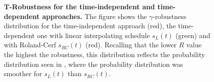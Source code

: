 \begin{figure}[ht]
  \centering
  \caption[Robustness for the time-independent hamiltonian]{\textbf{$\bm{T}$-Robustness for the time-independent and time-dependent approaches.} The figure shows the $\gamma$-robustness distribution for the time-independent approach (red), the time-dependent one with linear interpolating schedule $s_L(t)$ (green) and with Roland-Cerf $s_{RC}(t)$ (red). Recalling that the lower $R$ value the highest the robustness, this distribution reflects the probability distribution seen in , where the probability distribution was smoother for $s_L(t)$ than $s_{RC}(t)$.}
\end{figure}
